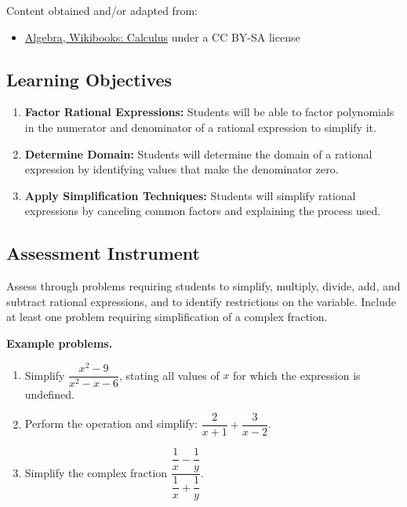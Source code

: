 Content obtained and/or adapted from:

\begin{itemize}
    \item \href{https://en.wikibooks.org/wiki/Calculus/Algebra}{Algebra, Wikibooks: Calculus} under a CC BY-SA license
\end{itemize}

\subsection{Learning Objectives}
\label{ssec:lear-6bf9}

\begin{enumerate}
    \item \textbf{Factor Rational Expressions:} Students will be able to factor polynomials in the numerator and denominator of a rational expression to simplify it.
    \item \textbf{Determine Domain:} Students will determine the domain of a rational expression by identifying values that make the denominator zero.
    \item \textbf{Apply Simplification Techniques:} Students will simplify rational expressions by canceling common factors and explaining the process used.
\end{enumerate}

\subsection{Assessment Instrument}
\label{ssec:asse-31c0}

Assess through problems requiring students to simplify, multiply, divide, add, and
subtract rational expressions, and to identify restrictions on the variable. Include at
least one problem requiring simplification of a complex fraction.

\textbf{Example problems.}

\begin{enumerate}
    \item Simplify $\dfrac{x^2 - 9}{x^2 - x - 6}$, stating all values of $x$ for which the expression is undefined.
    \item Perform the operation and simplify: $\dfrac{2}{x + 1} + \dfrac{3}{x - 2}$.
    \item Simplify the complex fraction $\dfrac{\dfrac{1}{x} - \dfrac{1}{y}}{\dfrac{1}{x} + \dfrac{1}{y}}$.
\end{enumerate}

